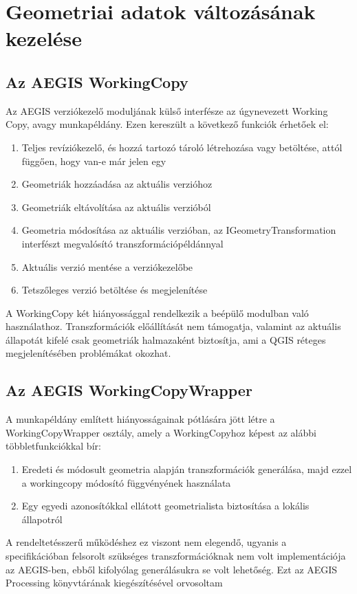 \section{Geometriai adatok változásának kezelése}
\subsection{Az AEGIS WorkingCopy}
Az AEGIS verziókezelő moduljának külső interfésze az úgynevezett Working Copy, avagy munkapéldány. Ezen kereszült a következő funkciók érhetőek el:
\begin{enumerate}
	\item Teljes revíziókezelő, és hozzá tartozó tároló létrehozása vagy betöltése, attól függően, hogy van-e már jelen egy
	\item Geometriák hozzáadása az aktuális verzióhoz
	\item Geometriák eltávolítása az aktuális verzióból
	\item Geometria módosítása az aktuális verzióban, az IGeometryTransformation interfészt megvalósító transzformációpéldánnyal
	\item Aktuális verzió mentése a verziókezelőbe
	\item Tetszőleges verzió betöltése és megjelenítése
\end{enumerate}
A WorkingCopy két hiányossággal rendelkezik a beépülő modulban való használathoz. Transzformációk előállítását nem támogatja, valamint az aktuális állapotát kifelé csak geometriák halmazaként biztosítja, ami a QGIS réteges megjelenítésében problémákat okozhat.
\subsection{Az AEGIS WorkingCopyWrapper}
A munkapéldány említett hiányosságainak pótlására jött létre a WorkingCopyWrapper osztály, amely a WorkingCopyhoz képest az alábbi többletfunkciókkal bír:
\begin{enumerate}
	\item Eredeti és módosult geometria alapján transzformációk generálása, majd ezzel a workingcopy módosító függvényének használata
	\item Egy egyedi azonosítókkal ellátott geometrialista biztosítása a lokális állapotról
\end{enumerate}
A rendeltetésszerű működéshez ez viszont nem elegendő, ugyanis a specifikációban felsorolt szükséges transzformációknak nem volt implementációja az AEGIS-ben, ebből kifolyólag generálásukra se volt lehetőség. Ezt az AEGIS Processing könyvtárának kiegészítésével orvosoltam
